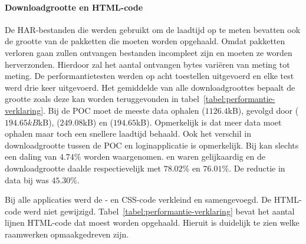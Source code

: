 \paragraph{Downloadgrootte en HTML-code}
De HAR-bestanden die werden gebruikt om de laadtijd op te meten bevatten ook de grootte van de pakketten die moeten worden opgehaald.
Omdat pakketten verloren gaan zullen ontvangen bestanden incompleet zijn en moeten ze worden herverzonden. %
Hierdoor zal het aantal ontvangen bytes variëren van meting tot meting.
De performantietesten werden op acht toestellen uitgevoerd en elke test werd drie keer uitgevoerd.
Het gemiddelde van alle downloadgroottes bepaalt de grootte zoals deze kan worden teruggevonden in tabel~\ref{tabel:performantie-verklaring}.
Bij de POC moet \st{} de meeste data ophalen ($1126.4$kB),  gevolgd door \kendo{} ($194.65kB$kB), \lungo{} ($249.08$kB) en \jqm{} ($194.65$kB).
Opmerkelijk is dat \lungo{} meer data moet ophalen maar toch een snellere laadtijd behaald.
Ook het verschil in downloadgrootte tussen de POC en loginapplicatie is opmerkelijk.
Bij \jqm{} kan slechts een daling van $4.74\%$ worden waargenomen.
\st{} en \lungo{} waren gelijkaardig en de downloadgrootte daalde respectievelijk met $78.02\%$ en $76.01\%$.
De reductie in data bij \kendo{} was $45.30\%$.

Bij alle applicaties werd de \js{}- en CSS-code verkleind en samengevoegd.
De HTML-code werd niet gewijzigd.
Tabel~\ref{tabel:performantie-verklaring} bevat het aantal lijnen HTML-code dat moest worden opgehaald.
Hieruit is duidelijk te zien welke raamwerken opmaakgedreven zijn.
